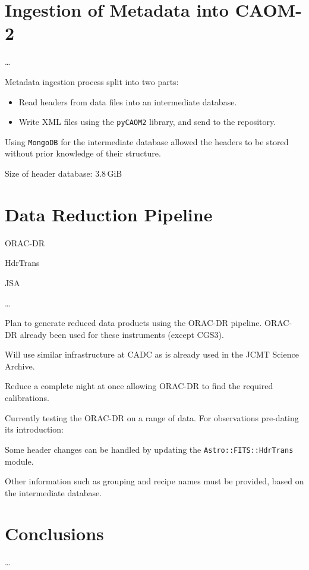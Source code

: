 \documentclass[11pt,twoside]{article}
\begin{document}
\section{Ingestion of Metadata into CAOM-2}

\ldots

Metadata ingestion process split into two parts:

\begin{itemize}
\item Read headers from data files into an intermediate database.

\item Write XML files using the \texttt{pyCAOM2} library, and send to the repository.
\end{itemize}

Using \texttt{MongoDB} for the intermediate database allowed the
headers to be stored without prior knowledge of their structure.

Size of header database: 3.8\,GiB

\section{Data Reduction Pipeline}

ORAC-DR \citep{1999ASPC..172...11E,2008AN....329..295C}

HdrTrans \citep[section 2.2]{2008AN....329..295C}

JSA \citep{2011ASPC..442..203E}

\ldots

Plan to generate reduced data products using the ORAC-DR pipeline.
ORAC-DR already been used for these instruments (except CGS3).

Will use similar infrastructure at CADC as is already
used in the JCMT Science Archive.

Reduce a complete night at once allowing
ORAC-DR to find the required calibrations.

Currently testing the ORAC-DR on a range of data.
For observations pre-dating its introduction:

Some header changes can be handled by updating the
\texttt{Astro::FITS::HdrTrans} module.

Other information such as grouping and recipe names
must be provided, based on the intermediate database.


\section{Conclusions}

\ldots


\end{document}
